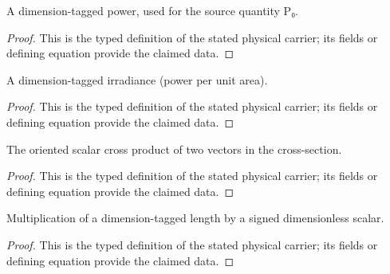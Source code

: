 \begin{definition}
  \label{def:physics:IPhO_2026_2_B_1:aux006}
  A dimension-tagged power, used for the source quantity P₀.
\end{definition}
\begin{proof}
  This is the typed definition of the stated physical carrier; its fields or defining equation provide the claimed data.
\end{proof}

\begin{definition}
  \label{def:physics:IPhO_2026_2_B_1:aux007}
  A dimension-tagged irradiance (power per unit area).
\end{definition}
\begin{proof}
  This is the typed definition of the stated physical carrier; its fields or defining equation provide the claimed data.
\end{proof}

\begin{definition}
  \label{def:physics:IPhO_2026_2_B_1:aux008}
  The oriented scalar cross product of two vectors in the cross-section.
\end{definition}
\begin{proof}
  This is the typed definition of the stated physical carrier; its fields or defining equation provide the claimed data.
\end{proof}

\begin{definition}
  \label{def:physics:IPhO_2026_2_B_1:aux009}
  Multiplication of a dimension-tagged length by a signed dimensionless scalar.
\end{definition}
\begin{proof}
  This is the typed definition of the stated physical carrier; its fields or defining equation provide the claimed data.
\end{proof}

